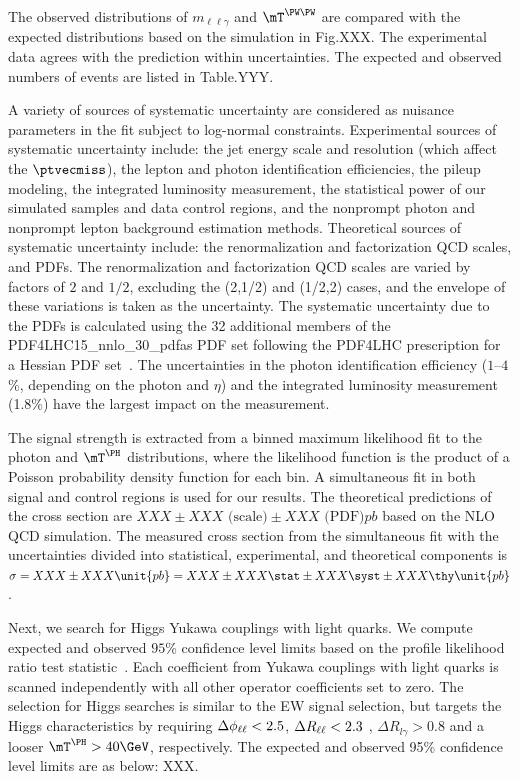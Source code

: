 The observed distributions of $m_{\ell\ell\gamma}$ and $\mTWW$ are compared with the expected distributions based on the \MGvATNLO simulation in Fig.XXX. The experimental data agrees with the prediction within uncertainties. The expected and observed numbers of events are listed in Table.YYY.

A variety of sources of systematic uncertainty are considered as nuisance parameters in the fit subject to log-normal constraints. Experimental sources of systematic uncertainty include: the jet energy scale and resolution (which affect the $\ptvecmiss$), the lepton and photon identification efficiencies, the pileup modeling, the integrated luminosity measurement, the statistical power of our simulated samples and data control regions, and the nonprompt photon and nonprompt lepton background estimation methods. Theoretical sources of systematic uncertainty include: the renormalization and factorization QCD scales, and PDFs. The renormalization and factorization QCD scales are varied by factors of $2$ and $1/2$, excluding the (2,1/2) and (1/2,2) cases, and the envelope of these variations is taken as the uncertainty. The systematic uncertainty due to the PDFs is calculated using the 32 additional members of the PDF4LHC15\_nnlo\_30\_pdfas PDF set following the PDF4LHC prescription for a Hessian PDF set~\cite{Butterworth_2016,Harland_Lang_2015,Ball_2015,PhysRevD.93.033006}. The uncertainties in the photon identification efficiency ($1$--$4$\%, depending on the photon \pt and $\eta$) and the integrated luminosity measurement (1.8\%) have the largest impact on the measurement.

The signal strength is extracted from a binned maximum likelihood fit to the photon \pt and $\mTH$ distributions, where the likelihood function is the product of a Poisson probability density function for each bin. A simultaneous fit in both signal and control regions is used for our results. The theoretical predictions of the cross section are $XXX \pm XXX \text{ (scale)} \pm XXX \text{ (PDF)} \unit{pb}$ based on the NLO QCD \MGvATNLO simulation. The measured cross section from the simultaneous fit with the uncertainties divided into statistical, experimental, and theoretical components is $\sigma = XXX \pm XXX \unit{pb} =XXX \pm XXX \stat \pm XXX \syst \pm XXX \thy \unit{pb}$. 

Next, we search for Higgs Yukawa couplings with light quarks. We compute expected and observed $95\%$ confidence level limits based on the profile likelihood ratio test statistic~\cite{CMS-NOTE-2011-005}. Each coefficient from  Yukawa couplings with light quarks is scanned independently with all other operator coefficients set to zero. The selection for Higgs searches is similar to the EW signal selection, but targets the Higgs characteristics by requiring $\Delta\phi_{\ell\ell}<2.5$, $\Delta R_{\ell\ell}<2.3$ , $\Delta R_{l\gamma} >0.8$ and a looser $\mTH > 40\GeV$, respectively. The expected and observed 95\% confidence level limits are as below: XXX.

